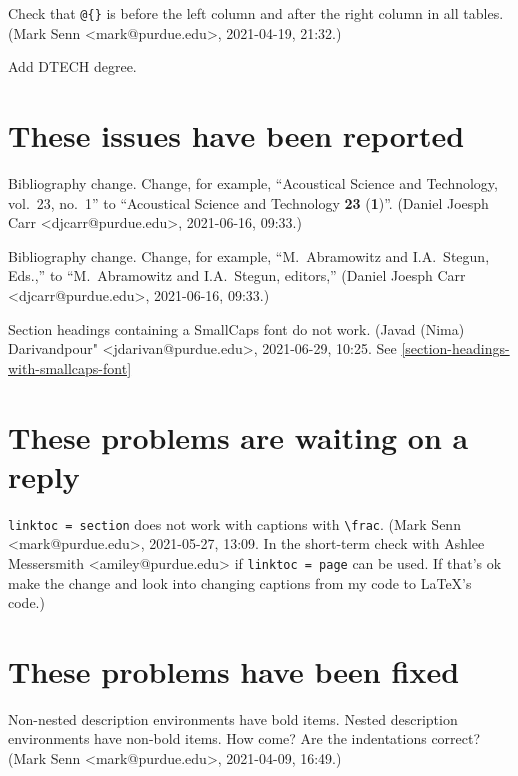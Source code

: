 \bug
Check that \verb+@{}+ is before the left column
and after the right column in all tables.
{\small (Mark Senn <mark@purdue.edu>, 2021-04-19, 21:32.)}

\bug  
Add DTECH degree.


\section{These issues have been reported}

\bug
Bibliography change.
Change,
for example,
``Acoustical Science and Technology, vol.~23, no.~1''
to
``Acoustical Science and Technology {\bfseries 23\/} ({\bfseries 1\/})''.
{\small (Daniel Joesph Carr <djcarr@purdue.edu>, 2021-06-16, 09:33.)}

\bug
Bibliography change.
Change,
for example,
``M.~Abramowitz and I.A.~Stegun, Eds.,''
to
``M.~Abramowitz and I.A.~Stegun, editors,''
{\small (Daniel Joesph Carr <djcarr@purdue.edu>, 2021-06-16, 09:33.)}

\bug
Section headings containing a SmallCaps font do not work.
{\small (Javad (Nima) Darivandpour" <jdarivan@purdue.edu>, 2021-06-29, 10:25.}
See \ref{section-headings-with-smallcaps-font}

\section{These problems are waiting on a reply}

\verb+linktoc = section+ does not work with captions with \verb+\frac+.
{\small
  (Mark Senn <mark@purdue.edu>, 2021-05-27, 13:09.
  In the short-term check with Ashlee Messersmith <amiley@purdue.edu>
  if \verb+linktoc = page+ can be used.
  If that's ok make the change
  and look into changing captions from my code
  to \LaTeX's code.)%
}


\section{These problems have been fixed}

Non-nested description environments have bold items.
Nested description environments have non-bold items.
How come?
Are the indentations correct?
{\small (Mark Senn <mark@purdue.edu>, 2021-04-09, 16:49.)}

